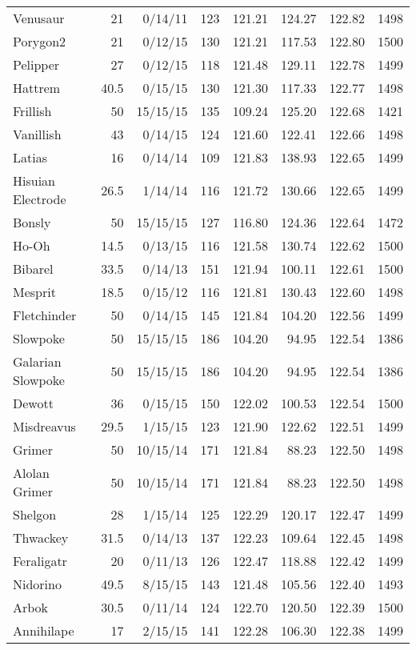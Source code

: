 \begin{longtable}{lrrrrrrr}
Venusaur & 21 & 0/14/11 & 123 & 121.21 & 124.27 & 122.82 & 1498\\
Porygon2 & 21 & 0/12/15 & 130 & 121.21 & 117.53 & 122.80 & 1500\\
Pelipper & 27 & 0/12/15 & 118 & 121.48 & 129.11 & 122.78 & 1499\\
Hattrem & 40.5 & 0/15/15 & 130 & 121.30 & 117.33 & 122.77 & 1498\\
Frillish & 50 & 15/15/15 & 135 & 109.24 & 125.20 & 122.68 & 1421\\
Vanillish & 43 & 0/14/15 & 124 & 121.60 & 122.41 & 122.66 & 1498\\
Latias & 16 & 0/14/14 & 109 & 121.83 & 138.93 & 122.65 & 1499\\
Hisuian Electrode & 26.5 & 1/14/14 & 116 & 121.72 & 130.66 & 122.65 & 1499\\
Bonsly & 50 & 15/15/15 & 127 & 116.80 & 124.36 & 122.64 & 1472\\
Ho-Oh & 14.5 & 0/13/15 & 116 & 121.58 & 130.74 & 122.62 & 1500\\
Bibarel & 33.5 & 0/14/13 & 151 & 121.94 & 100.11 & 122.61 & 1500\\
Mesprit & 18.5 & 0/15/12 & 116 & 121.81 & 130.43 & 122.60 & 1498\\
Fletchinder & 50 & 0/14/15 & 145 & 121.84 & 104.20 & 122.56 & 1499\\
Slowpoke & 50 & 15/15/15 & 186 & 104.20 & 94.95 & 122.54 & 1386\\
Galarian Slowpoke & 50 & 15/15/15 & 186 & 104.20 & 94.95 & 122.54 & 1386\\
Dewott & 36 & 0/15/15 & 150 & 122.02 & 100.53 & 122.54 & 1500\\
Misdreavus & 29.5 & 1/15/15 & 123 & 121.90 & 122.62 & 122.51 & 1499\\
Grimer & 50 & 10/15/14 & 171 & 121.84 & 88.23 & 122.50 & 1498\\
Alolan Grimer & 50 & 10/15/14 & 171 & 121.84 & 88.23 & 122.50 & 1498\\
Shelgon & 28 & 1/15/14 & 125 & 122.29 & 120.17 & 122.47 & 1499\\
Thwackey & 31.5 & 0/14/13 & 137 & 122.23 & 109.64 & 122.45 & 1498\\
Feraligatr & 20 & 0/11/13 & 126 & 122.47 & 118.88 & 122.42 & 1499\\
Nidorino & 49.5 & 8/15/15 & 143 & 121.48 & 105.56 & 122.40 & 1493\\
Arbok & 30.5 & 0/11/14 & 124 & 122.70 & 120.50 & 122.39 & 1500\\
Annihilape & 17 & 2/15/15 & 141 & 122.28 & 106.30 & 122.38 & 1499\\

\end{longtable}
